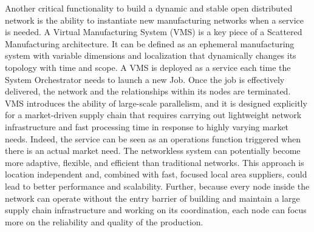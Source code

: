 Another critical functionality to build a dynamic and stable open distributed network is the ability to instantiate new manufacturing networks when a service is needed. A Virtual Manufacturing System (VMS) is a key piece of a Scattered Manufacturing architecture. It can be defined as an ephemeral manufacturing system with variable dimensions and localization that dynamically changes its topology with time and scope. A VMS is deployed as a service each time the System Orchestrator needs to launch a new Job. Once the job is effectively delivered, the network and the relationships within its nodes are terminated. VMS introduces the ability of large-scale parallelism, and it is designed explicitly for a market-driven supply chain that requires carrying out lightweight network infrastructure and fast processing time in response to highly varying market needs. Indeed, the service can be seen as an operations function triggered when there is an actual market need. The networkless system can potentially become more adaptive, flexible, and efficient than traditional networks. This approach is location independent and, combined with fast, focused local area suppliers, could lead to better performance and scalability. Further, because every node inside the network can operate without the entry barrier of building and maintain a large supply chain infrastructure and working on its coordination, each node can focus more on the reliability and quality of the production.
